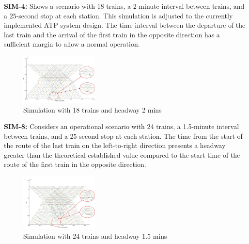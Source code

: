 \documentclass[conference]{IEEEtran}
\begin{document}
\textbf{SIM-4:}
Shows a scenario with 18 trains\cite{b18}, a 2-minute interval between trains\cite{b18}, and a 25-second stop at each station\cite{b15}. This simulation is adjusted to the currently implemented ATP system design. The time interval between the departure of the last train and the arrival of the first train in the opposite direction has a sufficient margin to allow a normal operation.\\
\begin{figure}[htbp]
    \centering
    \includegraphics[width=0.35\textwidth,scale=1]{Imagenes_general/SIM-4_TIME-25_HW-2_TRAINS-18.jpg}
    \caption{Simulation with 18 trains and headway 2 mins}
    \label{fig:Simulation 4: 18 Trains / 2 mins headway}
\end{figure}

\textbf{SIM-8:}
Considers an operational scenario with 24 trains, a 1.5-minute interval between trains, and a 25-second stop at each station\cite{b15}. The time from the start of the route of the last train on the left-to-right direction presents a headway greater than the theoretical established value compared to the start time of the route of the first train in the opposite direction.
\begin{figure}[htbp]
    \centering
    \includegraphics[width=0.35\textwidth,scale=1]{Imagenes_general/SIM-8_TIME-25_HW-1_5_TRAINS-24.jpg}
    \caption{Simulation with 24 trains and headway 1.5 mins}
    \label{fig:Simulation 8: 25 Trains / 1,5 mins headway}
\end{figure}
\end{document}
